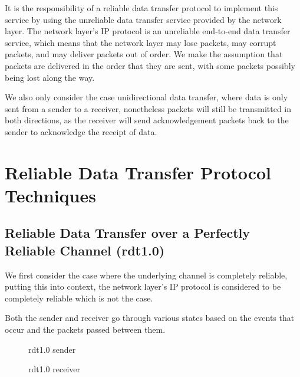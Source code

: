 \documentclass[12pt letter]{report}
\begin{document}
It is the  responsibility of a reliable data transfer protocol to
implement this service by using the unreliable data transfer service
provided by the network layer. The network layer's IP protocol is an
unreliable end-to-end data transfer service, which means that the
network layer may lose packets, may corrupt packets, and may deliver
packets out of order. We make the assumption that packets are
delivered in the order that they are sent, with some packets possibly
being lost along the way.

We also only consider the case unidirectional data transfer, where
data is only sent from a sender to a receiver, nonetheless packets
will still be transmitted in both directions, as the receiver will
send acknowledgement packets back to the sender to acknowledge the
receipt of data.

\section{Reliable Data Transfer Protocol Techniques}

\subsection{Reliable Data Transfer over a Perfectly Reliable Channel (rdt1.0)}

We first consider the case where the underlying channel is completely
reliable, putting this into context, the network layer's IP protocol
is considered to be completely reliable which is not the case.

Both the sender and receiver go through various states based on the
events that occur and the packets passed between them.

\begin{figure}[H]
  \centering
  \caption{rdt1.0 sender}
\end{figure}

\begin{figure}[H]
  \centering
  \caption{rdt1.0 receiver}
\end{figure}
\end{document}
